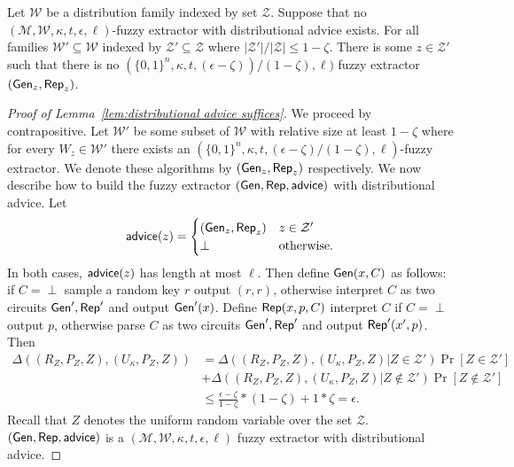 \begin{lemma}

Let $\mathcal{W}$ be a distribution family indexed by set $\mathcal{Z}$. Suppose that no $(\mathcal{M}, \mathcal{W}, \kappa, t, \epsilon, \ell)$-fuzzy extractor with distributional advice exists.  For all families $\mathcal{W}'\subseteq \mathcal{W}$ indexed by $\mathcal{Z}'\subseteq \mathcal{Z}$ where $|\mathcal{Z}'|/|\mathcal{Z}|\le 1-\zeta$.  There is some $z\in\mathcal{Z}'$ such that there is no  $(\{0,1\}^n,\kappa, t, (\epsilon-\zeta))/(1-\zeta), \ell)$ fuzzy extractor $({\mathsf{Gen}}_z, {\mathsf{Rep}}_z)$.
\label{lem:distributional advice suffices}
\end{lemma}
\begin{proof}[Proof of Lemma~\ref{lem:distributional advice suffices}]
We proceed by contrapositive.  Let $\mathcal{W}'$ be some subset of $\mathcal{W}$ with relative size at least $1-\zeta$ where  for every $W_z\in\mathcal{W}'$ there exists an $(\{0,1\}^n,\kappa, t, (\epsilon-\zeta)/(1-\zeta), \ell)$-fuzzy extractor.  We denote these algorithms by $({\mathsf{Gen}}_z, {\mathsf{Rep}}_z)$ respectively.  We now describe how to build the fuzzy extractor $({\mathsf{Gen}}, {\mathsf{Rep}}, {\mathsf{advice}})$ with distributional advice.  Let 
\[
{\mathsf{advice}}(z) = \begin{cases} ({\mathsf{Gen}}_z, {\mathsf{Rep}}_z)& z\in \mathcal{Z}'\\\perp&\text{otherwise.}\end{cases}
\]
In both cases, ${\mathsf{advice}}(z)$ has length at most $\ell$. Then define ${\mathsf{Gen}}(x, C)$ as follows:  if $C = \perp$ sample a random key $r$ output $(r, r)$, otherwise interpret $C$ as two circuits ${\mathsf{Gen}}', {\mathsf{Rep}}'$ and output ${\mathsf{Gen}}'(x)$.  Define ${\mathsf{Rep}}(x, p, C)$ interpret $C$ if $C = \perp$ output $p$, otherwise parse $C$ as two circuits ${\mathsf{Gen}}', {\mathsf{Rep}}'$ and output ${\mathsf{Rep}}'(x', p)$.  
Then 
\begin{align*}
\Delta((R_Z, P_Z, Z), (U_\kappa, P_Z, Z)) &= \Delta((R_Z, P_Z, Z), (U_\kappa, P_Z, Z) | Z\in \mathcal{Z}')\Pr[Z\in \mathcal{Z}']\\&+\Delta((R_Z, P_Z, Z), (U_\kappa, P_Z, Z) | Z\not\in \mathcal{Z}')\Pr[Z\not \in \mathcal{Z}']\\
&\le \frac{\epsilon-\zeta}{1-\zeta} * (1-\zeta) + 1* \zeta = \epsilon.
\end{align*}
Recall that $Z$ denotes the uniform random variable over the set $\mathcal{Z}$.
$({\mathsf{Gen}}, {\mathsf{Rep}}, {\mathsf{advice}})$ is a $(\mathcal{M}, \mathcal{W}, \kappa, t, \epsilon, \ell)$ fuzzy extractor with distributional advice.
\end{proof}

